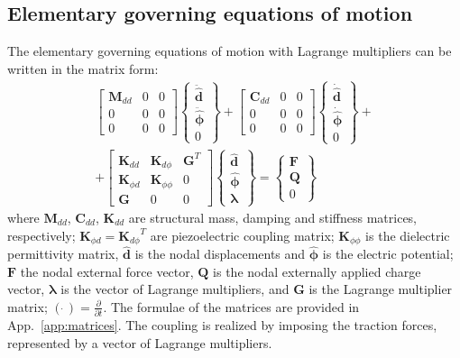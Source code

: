 \documentclass[materials,article,submit,moreauthors,pdftex]{Definitions/mdpi}
\begin{document}
{\subsection{Elementary governing equations of motion}
\label{sec:motion}
The elementary governing equations of motion with Lagrange multipliers can be written in the matrix form:
\begin{eqnarray}
\left[
\begin{array}{ccc}
\textbf{M}_{dd} & 0 & 0\\
0 & 0 & 0\\
0 & 0 & 0
\end{array} \right]
\left \{
\begin{array}{c}
\ddot{\widehat{\textbf{d}}}\\
\ddot{\widehat{\boldsymbol{\phi}}}\\
0
\end{array} \right \}+
\left[
\begin{array}{ccc}
\textbf{C}_{dd} & 0 & 0\\
0 & 0 & 0\\
0 & 0 & 0
\end{array} \right]
\left \{
\begin{array}{c}
\dot{\widehat{\textbf{d}}}\\
\dot{\widehat{\boldsymbol{\phi}}}\\
0
\end{array} \right \}+\nonumber\\
+\left[
\begin{array}{ccc}
\textbf{K}_{dd} & \textbf{K}_{d\phi} & {\textbf{G}}^T\\
\textbf{K}_{\phi d} & \textbf{K}_{\phi \phi} & 0\\
\textbf{G} & 0 & 0
\end{array} \right]
\left \{
\begin{array}{c}
\widehat{\textbf{d}}\\
\widehat{\boldsymbol{\phi}}\\
\boldsymbol{\lambda}
\end{array} \right \}=
\left \{
\begin{array}{c}
\textbf{F}\\
\textbf{Q}\\
0
\end{array} \right \}
\label{eq:motion}
\end{eqnarray}
where \(\textbf{M}_{dd}\), \(\textbf{C}_{dd}\), \(\textbf{K}_{dd}\) are structural mass, damping and stiffness matrices, respectively; \(\textbf{K}_{\phi d}={\textbf{K}_{d\phi}}^T\) are piezoelectric coupling matrix; \(\textbf{K}_{\phi \phi}\) is the dielectric permittivity matrix, \(\widehat{\textbf{d}}\) is the nodal displacements and \(\widehat{\boldsymbol{\phi}}\) is the electric potential; \(\textbf{F}\) the nodal external force vector, \(\textbf{Q}\) is the nodal externally applied charge vector, \(\boldsymbol{\lambda}\) is the vector of Lagrange multipliers, and \(\textbf{G}\) is the Lagrange multiplier matrix; \((\dot{\ })=\frac{\partial}{\partial t}\).
The formulae of the matrices are provided in App.~\ref{app:matrices}.
The coupling is realized by imposing the traction forces, represented by a vector of Lagrange multipliers. 

}
\end{document}
